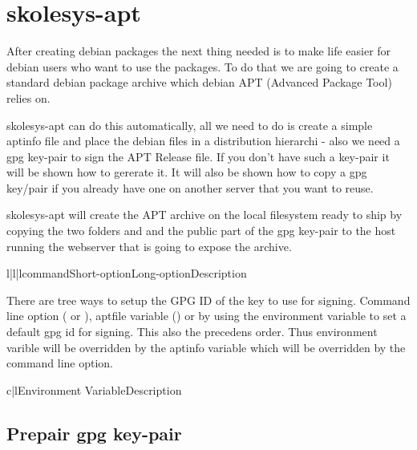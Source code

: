 \section{skolesys-apt\label{skolesys-apt}}
After creating debian packages the next thing needed is to make life easier for debian users who want to use the packages. To do that we are going to create a standard debian package archive which debian APT (Advanced Package Tool) relies on. 

skolesys-apt can do this automatically, all we need to do is create a simple aptinfo file and place the debian files in a distribution hierarchi - also we need a gpg key-pair to sign the APT Release file. If you don't have such a key-pair it will be shown how to gererate it. It will also be shown how to copy a gpg key/pair if you already have one on another server that you want to reuse.

skolesys-apt will create the APT archive on the local filesystem ready to ship by copying the two folders  and  and the public part of the gpg key-pair to the host running the webserver that is going to expose the archive.


\begin{tableiii}{l|l|l}{command}{Short-option}{Long-option}{Description}
\end{tableiii}

There are tree ways to setup the GPG ID of the key to use for signing. Command line option ( or ), aptfile variable () or by using the environment variable  to set a default gpg id for signing. This also the precedens order. Thus environment varible will be overridden by the aptinfo variable which will be overridden by the command line option.

\begin{tableii}{c|l}{}{Environment Variable}{Description}
\end{tableii}

\subsection{Prepair gpg key-pair\label{skolesys-apt-gpg}}

